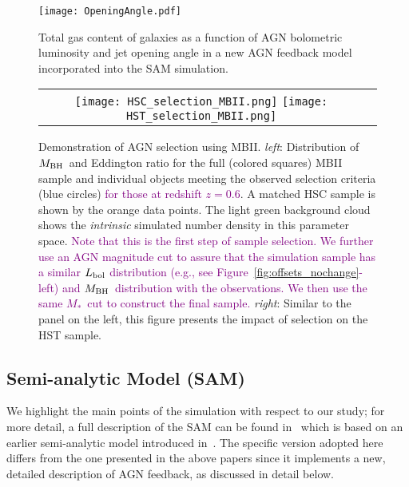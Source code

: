 \documentclass[twocolumn]{aastex631}
\newcommand{\todo}[1]{\textcolor{red}{[{\bf TODO}: #1]}}
\newcommand{\red}[1]{\textcolor{purple}{#1}}
\def\smass{{$M_*$}}
\def\mbh{$M_{\rm BH}$}
\begin{document}
\begin{figure}
\centering
\texttt{[image: OpeningAngle.pdf]}
\caption{\label{fig:SAM} 
Total gas content of galaxies as a function of AGN bolometric luminosity and jet opening angle in a new AGN feedback model incorporated into the SAM simulation.
}
\end{figure} 

\begin{figure*}
\centering
\begin{tabular}{c c}
{\texttt{[image: HSC\_selection\_MBII.png]}}
{\texttt{[image: HST\_selection\_MBII.png]}}
\end{tabular}
\caption{\label{fig:selection}Demonstration of AGN selection using MBII. {\it left}: Distribution of \mbh\ and Eddington ratio for the full (colored squares) MBII sample and individual objects meeting the observed selection criteria (blue circles) \red{for those at redshift $z=0.6$}. A matched HSC sample is shown by the orange data points. The light green background cloud shows the {\it intrinsic} simulated number density in this parameter space. \red{Note that this is the first step of sample selection. We further use an AGN magnitude cut to assure that the simulation sample has a similar $L_{\rm bol}$ distribution (e.g., see Figure~\ref{fig:offsets_nochange}-left) and \mbh\ distribution with the observations. We then use the same \smass\ cut to construct the final sample.}
{\it right}: Similar to the panel on the left, this figure presents the impact of selection on the HST sample.
}
\end{figure*}

\subsection{Semi-analytic Model (SAM)}\label{subsec:SAM}
We highlight the main points of the simulation with respect to our study; for more detail, a full description of the SAM can be found in~\citet{Menci2016} which is based on an earlier semi-analytic model introduced in~\citet{Menci2014}. The specific version adopted here differs from the one presented in the above papers since it implements a new, detailed description of AGN feedback, as discussed in detail below.
\end{document}
